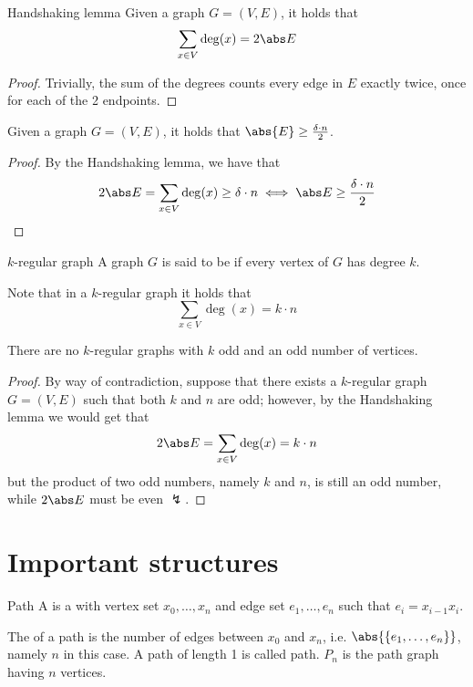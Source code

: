 \documentclass[a4paper, 12pt]{report}
\begin{document}
    \begin{framedlem}{Handshaking lemma}
        Given a graph $G = (V, E)$, it holds that $$\sum_{x \in V}{\deg(x)} = 2 \abs E$$
    \end{framedlem}

    \begin{proof}
        Trivially, the sum of the degrees counts every edge in $E$ exactly twice, once for each of the 2 endpoints.
    \end{proof}

    \begin{framedcor}[label={cor handshaking}]{}
        Given a graph $G = (V, E)$, it holds that $\abs{E} \ge \tfrac{\delta \cdot n}{2}$.
    \end{framedcor}

    \begin{proof}
        By the Handshaking lemma, we have that $$2 \abs E = \sum_{x \in V}{\deg(x)} \ge \delta \cdot n \iff \abs E \ge \dfrac{\delta \cdot n}{2}$$
    \end{proof}

    \begin{frameddefn}{$k$-regular graph}
        A graph $G$ is said to be  if every vertex of $G$ has degree $k$.
    \end{frameddefn}

    Note that in a $k$-regular graph it holds that $$\sum_{x \in V}{\deg(x)} = k \cdot n$$

    \begin{framedprop}{}
        There are no $k$-regular graphs with $k$ odd and an odd number of vertices.
    \end{framedprop}
    
    \begin{proof}
        By way of contradiction, suppose that there exists a $k$-regular graph $G = (V, E)$ such that both $k$ and $n$ are odd; however, by the Handshaking lemma we would get that $$2 \abs E = \sum_{x \in V} {\deg(x)} = k \cdot n$$ but the product of two odd numbers, namely $k$ and $n$, is still an odd number, while $2 \abs E$ must be even $\lightning$.
    \end{proof}

    \section{Important structures}

    \begin{frameddefn}{Path}
        A  is a  with vertex set $x_0, \ldots, x_n$ and edge set $e_1, \ldots, e_n$ such that $e_i = x_{i - 1}x_i$.

        The  of a path is the number of edges between $x_0$ and $x_n$, i.e. $\abs{\{e_1, \ldots, e_n\}}$, namely $n$ in this case. A path of length 1 is called  path. $P_n$ is the path graph having $n$ vertices.
    \end{frameddefn}
\end{document}
